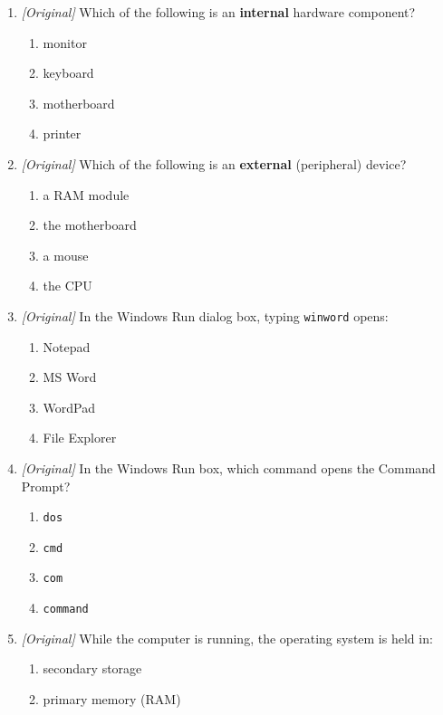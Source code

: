 \begin{enumerate}[label=\textbf{Q\arabic*.}, leftmargin=*]
\begin{enumerate}[label=\Alph*.]
    \item I and II only
    \item II and III only
    \item I, II, and III
  \end{enumerate}
\item \textit{[Original]} Which of the following is an \textbf{internal}
  hardware component?
  \begin{enumerate}[label=\Alph*.]
    \item monitor
    \item keyboard
    \item motherboard
    \item printer
  \end{enumerate}
\item \textit{[Original]} Which of the following is an \textbf{external}
  (peripheral) device?
  \begin{enumerate}[label=\Alph*.]
    \item a RAM module
    \item the motherboard
    \item a mouse
    \item the CPU
  \end{enumerate}
\item \textit{[Original]} In the Windows Run dialog box, typing
  \texttt{winword} opens:
  \begin{enumerate}[label=\Alph*.]
    \item Notepad
    \item MS Word
    \item WordPad
    \item File Explorer
  \end{enumerate}
\item \textit{[Original]} In the Windows Run box, which command opens the
  Command Prompt?
  \begin{enumerate}[label=\Alph*.]
    \item \texttt{dos}
    \item \texttt{cmd}
    \item \texttt{com}
    \item \texttt{command}
  \end{enumerate}
\item \textit{[Original]} While the computer is running, the operating system
  is held in:
  \begin{enumerate}[label=\Alph*.]
    \item secondary storage
    \item primary memory (RAM)

\end{enumerate}
\end{enumerate}
